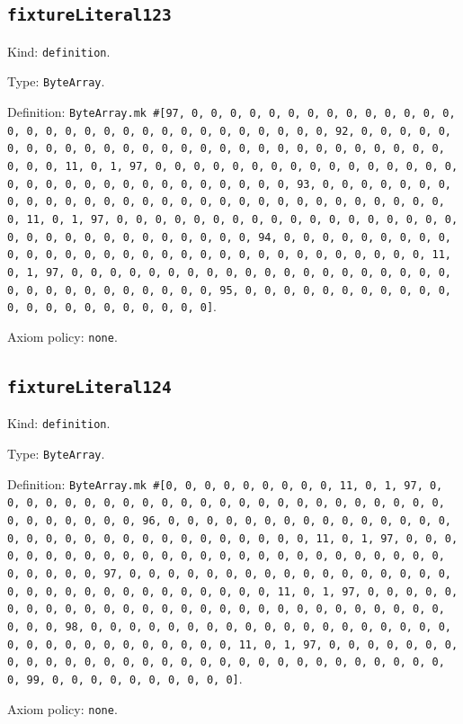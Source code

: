 \documentclass[11pt]{article}
\begin{document}
\subsection*{\texttt{fixtureLiteral123}}
\noindent Kind: \texttt{definition}.\par
\noindent Type: \texttt{ByteArray}.\par
\noindent Definition: \texttt{ByteArray.mk \#[97, 0, 0, 0, 0, 0, 0, 0, 0, 0, 0, 0, 0, 0, 0, 0, 0, 0, 0, 0, 0, 0, 0, 0, 0, 0, 0, 0, 0, 0, 0, 0, 92, 0, 0, 0, 0, 0, 0, 0, 0, 0, 0, 0, 0, 0, 0, 0, 0, 0, 0, 0, 0, 0, 0, 0, 0, 0, 0, 0, 0, 0, 0, 0, 11, 0, 1, 97, 0, 0, 0, 0, 0, 0, 0, 0, 0, 0, 0, 0, 0, 0, 0, 0, 0, 0, 0, 0, 0, 0, 0, 0, 0, 0, 0, 0, 0, 0, 0, 93, 0, 0, 0, 0, 0, 0, 0, 0, 0, 0, 0, 0, 0, 0, 0, 0, 0, 0, 0, 0, 0, 0, 0, 0, 0, 0, 0, 0, 0, 0, 0, 11, 0, 1, 97, 0, 0, 0, 0, 0, 0, 0, 0, 0, 0, 0, 0, 0, 0, 0, 0, 0, 0, 0, 0, 0, 0, 0, 0, 0, 0, 0, 0, 0, 0, 0, 94, 0, 0, 0, 0, 0, 0, 0, 0, 0, 0, 0, 0, 0, 0, 0, 0, 0, 0, 0, 0, 0, 0, 0, 0, 0, 0, 0, 0, 0, 0, 0, 11, 0, 1, 97, 0, 0, 0, 0, 0, 0, 0, 0, 0, 0, 0, 0, 0, 0, 0, 0, 0, 0, 0, 0, 0, 0, 0, 0, 0, 0, 0, 0, 0, 0, 0, 95, 0, 0, 0, 0, 0, 0, 0, 0, 0, 0, 0, 0, 0, 0, 0, 0, 0, 0, 0, 0, 0, 0]}.\par
\noindent Axiom policy: \texttt{none}.\par
\subsection*{\texttt{fixtureLiteral124}}
\noindent Kind: \texttt{definition}.\par
\noindent Type: \texttt{ByteArray}.\par
\noindent Definition: \texttt{ByteArray.mk \#[0, 0, 0, 0, 0, 0, 0, 0, 0, 11, 0, 1, 97, 0, 0, 0, 0, 0, 0, 0, 0, 0, 0, 0, 0, 0, 0, 0, 0, 0, 0, 0, 0, 0, 0, 0, 0, 0, 0, 0, 0, 0, 0, 0, 96, 0, 0, 0, 0, 0, 0, 0, 0, 0, 0, 0, 0, 0, 0, 0, 0, 0, 0, 0, 0, 0, 0, 0, 0, 0, 0, 0, 0, 0, 0, 0, 11, 0, 1, 97, 0, 0, 0, 0, 0, 0, 0, 0, 0, 0, 0, 0, 0, 0, 0, 0, 0, 0, 0, 0, 0, 0, 0, 0, 0, 0, 0, 0, 0, 0, 0, 97, 0, 0, 0, 0, 0, 0, 0, 0, 0, 0, 0, 0, 0, 0, 0, 0, 0, 0, 0, 0, 0, 0, 0, 0, 0, 0, 0, 0, 0, 0, 0, 11, 0, 1, 97, 0, 0, 0, 0, 0, 0, 0, 0, 0, 0, 0, 0, 0, 0, 0, 0, 0, 0, 0, 0, 0, 0, 0, 0, 0, 0, 0, 0, 0, 0, 0, 98, 0, 0, 0, 0, 0, 0, 0, 0, 0, 0, 0, 0, 0, 0, 0, 0, 0, 0, 0, 0, 0, 0, 0, 0, 0, 0, 0, 0, 0, 0, 0, 11, 0, 1, 97, 0, 0, 0, 0, 0, 0, 0, 0, 0, 0, 0, 0, 0, 0, 0, 0, 0, 0, 0, 0, 0, 0, 0, 0, 0, 0, 0, 0, 0, 0, 0, 99, 0, 0, 0, 0, 0, 0, 0, 0, 0, 0]}.\par
\noindent Axiom policy: \texttt{none}.\par
\end{document}
